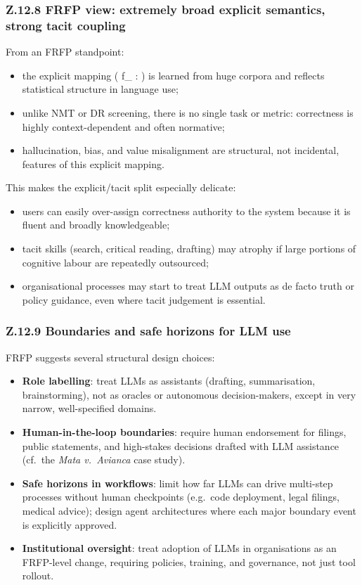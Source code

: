 \subsubsection*{Z.12.8 FRFP view: extremely broad explicit semantics, strong tacit coupling}

From an FRFP standpoint:

\begin{itemize}
\item the explicit mapping
(
f_{} :  \to {}
)
is learned from huge corpora and reflects statistical structure in
language use;
\item unlike NMT or DR screening, there is no single task or metric:
correctness is highly context-dependent and often normative;
\item hallucination, bias, and value misalignment are structural, not
incidental, features of this explicit mapping.
\end{itemize}

This makes the explicit/tacit split especially delicate:

\begin{itemize}
\item users can easily over-assign correctness authority to the system
because it is fluent and broadly knowledgeable;
\item tacit skills (search, critical reading, drafting) may atrophy if
large portions of cognitive labour are repeatedly outsourced;
\item organisational processes may start to treat LLM outputs as de facto
truth or policy guidance, even where tacit judgement is essential.
\end{itemize}

\subsubsection*{Z.12.9 Boundaries and safe horizons for LLM use}

FRFP suggests several structural design choices:

\begin{itemize}
\item \textbf{Role labelling}:
treat LLMs as assistants (drafting, summarisation, brainstorming),
not as oracles or autonomous decision-makers, except in very narrow,
well-specified domains.
\item \textbf{Human-in-the-loop boundaries}:
require human endorsement for filings, public statements, and
high-stakes decisions drafted with LLM assistance (cf.\ the \emph{Mata
v.\ Avianca} case study).
\item \textbf{Safe horizons in workflows}:
limit how far LLMs can drive multi-step processes without human
checkpoints (e.g.\ code deployment, legal filings, medical advice);
design agent architectures where each major boundary event is
explicitly approved.
\item \textbf{Institutional oversight}:
treat adoption of LLMs in organisations as an FRFP-level change,
requiring policies, training, and governance, not just tool rollout.
\end{itemize}

